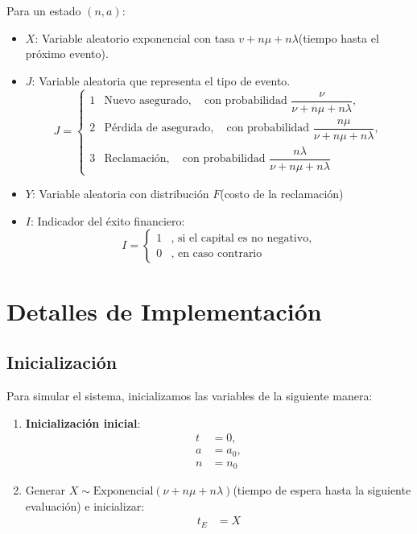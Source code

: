 \documentclass[12pt, a4paper]{article}
\begin{document}
Para un estado $(n,a)$:
\begin{itemize}
    \item $X$: Variable aleatorio exponencial con tasa $v+n\mu+n\lambda$(tiempo hasta el próximo evento).
    \item $J$: Variable aleatoria que representa el tipo de evento.
        \begin{equation}
            J = 
            \begin{cases}
                1 & \text{Nuevo asegurado}, \quad \text{con probabilidad } \dfrac{\nu}{\nu + n\mu + n\lambda}, \\
                2 & \text{Pérdida de asegurado}, \quad \text{con probabilidad } \dfrac{n\mu}{\nu + n\mu + n\lambda}, \\
                3 & \text{Reclamación}, \quad \text{con probabilidad } \dfrac{n\lambda}{\nu + n\mu + n\lambda}
            \end{cases}
        \end{equation}
    \item $Y$: Variable aleatoria con distribución $F$(costo de la reclamación)
    \item $I$: Indicador del éxito financiero:
        \begin{equation}
            I =
            \begin{cases}
                1 & \text{, si el capital es no negativo}, \\
                0 & \text{, en caso contrario}
            \end{cases}
        \end{equation}
\end{itemize}

\section{Detalles de Implementación} \label{S2}

\subsection*{Inicialización}
Para simular el sistema, inicializamos las variables de la siguiente manera:

\begin{enumerate}
    \item \textbf{Inicialización inicial}:
    \begin{align*}
        t &= 0, \\
        a &= a_0, \\
        n &= n_0
    \end{align*}
    
    \item Generar $X \sim \text{Exponencial}(\nu + n\mu + n\lambda)$(tiempo de espera hasta la siguiente evaluación) e inicializar:
    \begin{align*}
        t_E &= X
    \end{align*}
\end{enumerate}
\end{document}
